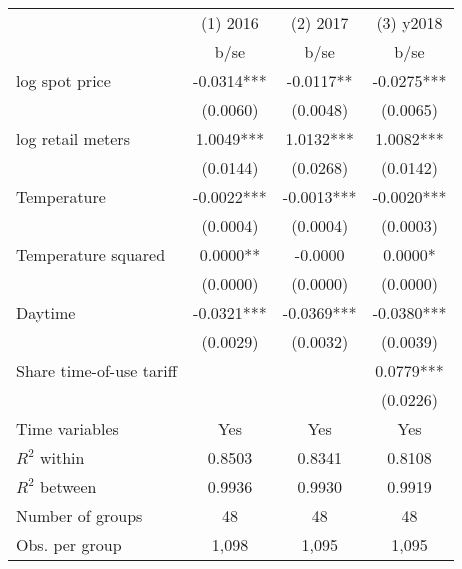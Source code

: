 \begin{tabular}{lccc}\toprule
                    &    (1) 2016   &    (2) 2017   &   (3) y2018   \\
                    &        b/se   &        b/se   &        b/se   \\
\midrule
log spot price      &     -0.0314***&     -0.0117** &     -0.0275***\\
                    &    (0.0060)   &    (0.0048)   &    (0.0065)   \\
log retail meters   &      1.0049***&      1.0132***&      1.0082***\\
                    &    (0.0144)   &    (0.0268)   &    (0.0142)   \\
Temperature         &     -0.0022***&     -0.0013***&     -0.0020***\\
                    &    (0.0004)   &    (0.0004)   &    (0.0003)   \\
Temperature squared &      0.0000** &     -0.0000   &      0.0000*  \\
                    &    (0.0000)   &    (0.0000)   &    (0.0000)   \\
Daytime             &     -0.0321***&     -0.0369***&     -0.0380***\\
                    &    (0.0029)   &    (0.0032)   &    (0.0039)   \\
Share time-of-use tariff&               &               &      0.0779***\\
                    &               &               &    (0.0226)   \\
Time variables      &         Yes   &         Yes   &         Yes   \\
\midrule
\(R^2\) within      &      0.8503   &      0.8341   &      0.8108   \\
\(R^2\) between     &      0.9936   &      0.9930   &      0.9919   \\
Number of groups    &          48   &          48   &          48   \\
Obs. per group      &       1,098   &       1,095   &       1,095   \\
\bottomrule\end{tabular}
